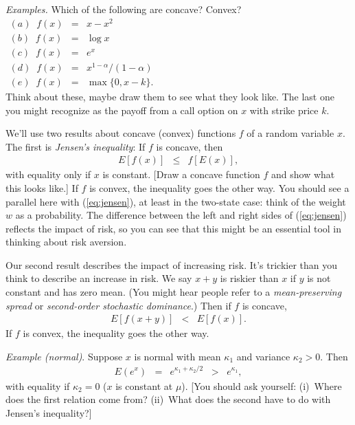 \documentclass[11pt]{article}
\begin{document}
{\it Examples.\/}
Which of the following are concave?  Convex?
\begin{eqnarray*}
    (a) \;\; f(x) &=& x - x^2 \\
    (b) \;\; f(x) &=& \log x  \\
    (c) \;\; f(x) &=& e^x \\
    (d) \;\; f(x) &=& x^{1-\alpha}/(1-\alpha) \\
    (e) \;\; f(x) &=& \max \{ 0, x-k \} .
    \phantom{xxxxxxxxxxxxxxxxxxxxxxxxxxxxxxxxxxxxxxx}
\end{eqnarray*}
Think about these, maybe draw them to see what they look like.
The last one you might recognize as the payoff from
a call option on $x$ with strike price $k$.


We'll use two results about concave (convex) functions $f$
of a random variable $x$.
The first is {\it Jensen's inequality\/}:
If $f$ is concave, then
\begin{eqnarray}
    E [f(x)] &\leq& f [E(x)] ,
    \label{eq:jensen}
\end{eqnarray}
with equality only if $x$ is constant.
[Draw a concave function $f$ and show what this looks like.]
If $f$ is convex, the inequality goes the other way.
You should see a parallel here with (\ref{eq:jensen}), at least in the two-state case:
think of the weight $w$ as a probability.
The difference between the left and right sides of (\ref{eq:jensen}) reflects
the impact of risk, so you can see that this might be
an essential tool in thinking about risk aversion.

Our second result describes the impact of increasing risk.
It's trickier than you think to describe an increase in risk.
We say $ x+y$ is riskier than $x$ if $y$ is not constant and has zero mean.
(You might hear people refer to a {\it mean-preserving spread\/} or
{\it second-order stochastic dominance\/}.) Then if $f$ is concave,
\begin{eqnarray*}
    E[ f(x + y)] &<& E[f(x)] .
\end{eqnarray*}
If $f$ is convex, the inequality goes the other way.

{\it Example (normal)\/}.
Suppose $x$ is normal with mean $\kappa_1$ and variance $\kappa_2>0$.
Then
\begin{eqnarray*}
    E \left( e^x \right) &=&  e^{\kappa_1 + \kappa_2/2}
            \;\;>\;\; e^{\kappa_1},
\end{eqnarray*}
with equality if $\kappa_2 = 0$ ($x$ is constant at $\mu$).
[You should ask yourself:
(i)~Where does the first relation come from?
(ii)~What does the second have to do with Jensen's inequality?]
\end{document}
